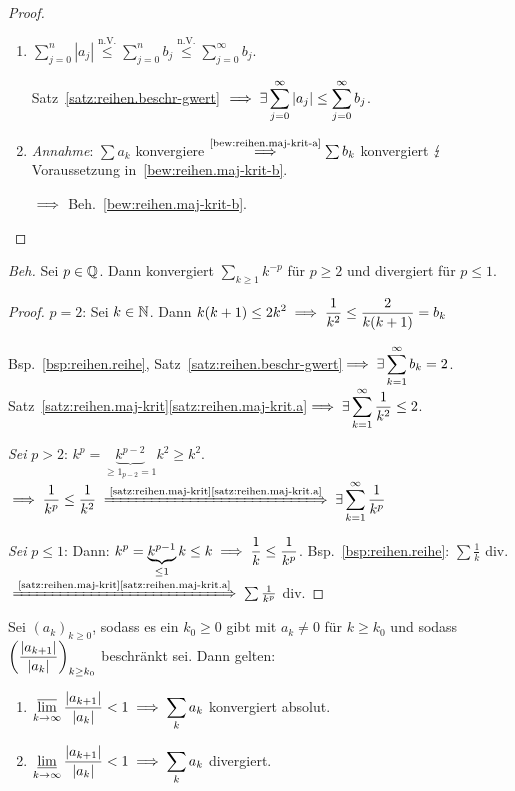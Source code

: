 \documentclass[12pt]{scrreprt}
\begin{document}
\begin{proof}
\begin{enumerate}%
\item \label{bew:reihen.maj-krit-a}$\displaystyle\sum^n_{j=0}|a_j| \stackrel{\text{n.V.}}{\leq} \sum^n_{j=0} b_j \stackrel{\text{n.V.}}{\leq} \sum^\infty_{j=0}b_j$.

Satz~\ref{satz:reihen.beschr-gwert} $\displaystyle\implies\exists\sum^\infty_{j=0}|a_j|\leq\sum^\infty_{j=0}b_j$.

\item \label{bew:reihen.maj-krit-b}\emph{Annahme}: $\sum a_k$ konvergiere $\stackrel{\text{\ref{bew:reihen.maj-krit-a}}}{\implies} \sum b_k$ konvergiert $\lightning$ Voraussetzung in~\ref{bew:reihen.maj-krit-b}. 

$\implies$ Beh.~\ref{bew:reihen.maj-krit-b}.
\end{enumerate}
\end{proof}

\begin{bsp}
  \label{bsp:reihen.maj-krit}
  \emph{Beh.} Sei $p\in\mathbb{Q}$. Dann konvergiert $\sum_{k\geq 1} k^{-p}$ für $p\geq 2$ und divergiert für $p\leq 1$.
  \begin{proof}
  $p=2$: Sei $k\in\mathbb{N}$. Dann $\displaystyle k(k+1) \leq 2k^2\implies\frac{1}{k^2}\leq\frac{2}{k(k+1)}=b_k$
  
  Bsp.~\ref{bsp:reihen.reihe}, Satz~\ref{satz:reihen.beschr-gwert}$\displaystyle\implies\exists\sum^\infty_{k=1}b_k=2$.
  Satz~\ref{satz:reihen.maj-krit}\ref{satz:reihen.maj-krit.a}$\displaystyle\implies\exists\sum^\infty_{k=1}\frac{1}{k^2}\leq 2$.
  
  \noindent\emph{Sei} $p>2$: $k^p = \underbrace{k^{p-2}}_{\geq 1_{p-2}=1}k^2\geq k^2$.
  $\displaystyle\folgt\frac{1}{k^p}\leq\frac{1}{k^2} \folgtwegen{\text{\ref{satz:reihen.maj-krit}\ref{satz:reihen.maj-krit.a}}}\exists\sum^\infty_{k=1}\frac{1}{k^p}$

  \noindent\emph{Sei} $p\leq 1$: Dann: $\displaystyle k^p=\underbrace{k^{p-1}}_{\leq 1}k\leq k\implies\frac{1}{k}\leq\frac{1}{k^p}$.
  Bsp.~\ref{bsp:reihen.reihe}: $\sum\frac{1}{k}$ div. $\folgtwegen{\text{\ref{satz:reihen.maj-krit}\ref{satz:reihen.maj-krit.a}}} \sum\frac{1}{k^p}$ div.
  \end{proof}
\end{bsp}

\begin{satz}[Quotientenkriterium]
  \label{satz:reihen.quot-krit}
  Sei $(a_k)_{k\geq 0}$, sodass es ein $k_0\geq 0$ gibt mit $a_k\neq 0$ für $k\geq k_0$ und sodass $\displaystyle\left(\frac{\left\lvert a_{k+1}\right\lvert}{\left\lvert a_k\right\lvert}\right)_{k\geq k_0}$ beschränkt sei. Dann gelten:
  \begin{enumerate}%
    \item \label{satz:reihen.quot-krit.a} $\displaystyle\varlimsup_{k\rightarrow\infty}\frac{\left\lvert a_{k+1}\right\lvert}{\left\lvert a_k\right\lvert}<1\implies\sum_k a_k$ konvergiert absolut.
    \item \label{satz:reihen.quot-krit.b} $\displaystyle\varliminf_{k\rightarrow\infty}\frac{\left\lvert a_{k+1}\right\lvert}{\left\lvert a_k\right\lvert}<1\implies\sum_k a_k$ divergiert.
  \end{enumerate}
\end{satz}
\end{document}
